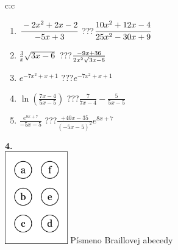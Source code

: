 \documentclass[10pt]{report}
\begin{document}
\begin{tabular}{c:c}
\begin{minipage}[c][104.5mm][t]{0.5\linewidth}
\begin{center}
\begin{minipage}{0.79\linewidth}
\begin{center}
\begin{varwidth}{\linewidth}
\begin{enumerate}
\item $\cfrac{-2x^2+2x-2}{-5x+3}$\quad \dotfill\; ???\;\dotfill \quad $\cfrac{10x^2+12x-4}{25x^2-30x+9}$
\item $\frac{3}{x}\sqrt{3x-6}$\quad \dotfill\; ???\;\dotfill \quad $\frac{-9x+36}{2x^2 \sqrt{\smash[b]{3x-6}}}$
\item $e^{-7x^2+x+1}$\quad \dotfill\; ???\;\dotfill \quad $e^{-7x^2+x+1}$
\item $\ln{\left(\frac{7x-4}{5x-5}\right)}$\quad \dotfill\; ???\;\dotfill \quad $\frac{7}{7x-4}-\frac{5}{5x-5}$
\item $\frac{e^{8x+7}}{-5x-5}$\quad \dotfill\; ???\;\dotfill \quad $\frac{+40x-35}{(-5x-5)^2}e^{8x+7}$
\end{enumerate}
\end{varwidth}
\end{center}
\end{minipage}
\begin{minipage}{0.20\linewidth}
\begin{center}
{\Huge\bfseries 4.} \\[2mm]
\includegraphics[height=40mm]{../images/braille.png}
{\small Písmeno Braillovej abecedy}
\end{center}
\end{minipage}
\end{center}
\end{minipage}
%
\end{tabular}
\newpage
\thispagestyle{empty}
\end{document}
